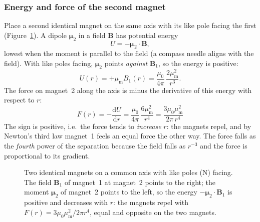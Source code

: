 \documentclass[11pt,a4paper]{article}
\newcommand{\magnetSN}[4]{%
  \fill[magnetS] (#1,#2) rectangle ({#1+#3/2},{#2+#4});
  \fill[magnetN] ({#1+#3/2},#2) rectangle ({#1+#3},{#2+#4});
  \node[white,font=\tiny] at ({#1+#3/4},{#2+#4/2}) {S};
  \node[white,font=\tiny] at ({#1+3*#3/4},{#2+#4/2}) {N};}
\newcommand{\magnetNS}[4]{%
  \fill[magnetN] (#1,#2) rectangle ({#1+#3/2},{#2+#4});
  \fill[magnetS] ({#1+#3/2},#2) rectangle ({#1+#3},{#2+#4});
  \node[white,font=\tiny] at ({#1+#3/4},{#2+#4/2}) {N};
  \node[white,font=\tiny] at ({#1+3*#3/4},{#2+#4/2}) {S};}
\newcommand{\muz}{\mu_0}
\newcommand{\mum}{\mu_{\mathrm m}}
\newcommand{\dd}{\mathrm{d}}
\begin{document}
\subsubsection{Energy and force of the second magnet}

Place a second identical magnet on the same axis with its like pole facing the first (Figure~\ref{fig:twomagnets}). A dipole $\bm\mu_2$ in a field $\bm B$ has potential energy
\begin{equation}
U=-\bm\mu_2\cdot\bm B,
\end{equation}
lowest when the moment is parallel to the field (a compass needle aligns with the field). With like poles facing, $\bm\mu_2$ points \emph{against} $\bm B_1$, so the energy is positive:
\begin{equation}
U(r)=+\mum B_1(r)=\frac{\muz}{4\pi}\,\frac{2\mum^2}{r^3}.
\end{equation}
The force on magnet~2 along the axis is minus the derivative of this energy with respect to $r$:
\begin{equation}
\boxed{\;F(r)=-\frac{\dd U}{\dd r}=\frac{\muz}{4\pi}\,\frac{6\mum^2}{r^4}=\frac{3\muz\mum^2}{2\pi\,r^4}\;}
\label{eq:F}
\end{equation}
The sign is positive, i.e.\ the force tends to \emph{increase} $r$: the magnets repel, and by Newton's third law magnet~1 feels an equal force the other way. The force falls as the \emph{fourth} power of the separation because the field falls as $r^{-3}$ and the force is proportional to its gradient.

\begin{figure}[htbp]
\centering
{}
\caption{Two identical magnets on a common axis with like poles (N) facing. The field $\bm B_1$ of magnet~1 at magnet~2 points to the right; the moment $\bm\mu_2$ of magnet~2 points to the left, so the energy $-\bm\mu_2\cdot\bm B_1$ is positive and decreases with $r$: the magnets repel with $F(r)=3\muz\mum^2/2\pi r^4$, equal and opposite on the two magnets.}
\label{fig:twomagnets}
\end{figure}
\end{document}
